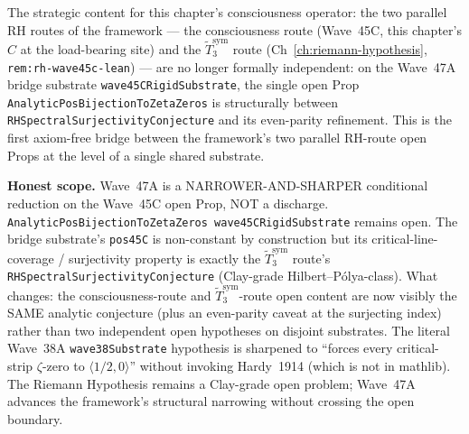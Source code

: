 \begin{remark}
\begin{itemize}
\end{itemize}
The strategic content for this chapter's consciousness operator: the two parallel RH routes of the framework --- the consciousness route (Wave~45C, this chapter's $C$ at the load-bearing site) and the $\widetilde{T}_3^{\mathrm{sym}}$ route (Ch~\ref{ch:riemann-hypothesis}, \texttt{rem:rh-wave45c-lean}) --- are no longer formally independent: on the Wave~47A bridge substrate \texttt{wave45CRigidSubstrate}, the single open Prop \texttt{AnalyticPosBijectionToZetaZeros} is structurally between \texttt{RHSpectralSurjectivityConjecture} and its even-parity refinement. This is the first axiom-free bridge between the framework's two parallel RH-route open Props at the level of a single shared substrate.

\textbf{Honest scope.} Wave~47A is a NARROWER-AND-SHARPER conditional reduction on the Wave~45C open Prop, NOT a discharge. \texttt{AnalyticPosBijectionToZetaZeros wave45CRigidSubstrate} remains open. The bridge substrate's \texttt{pos45C} is non-constant by construction but its critical-line-coverage / surjectivity property is exactly the $\widetilde{T}_3^{\mathrm{sym}}$ route's \texttt{RHSpectralSurjectivityConjecture} (Clay-grade Hilbert--P\'olya-class). What changes: the consciousness-route and $\widetilde{T}_3^{\mathrm{sym}}$-route open content are now visibly the SAME analytic conjecture (plus an even-parity caveat at the surjecting index) rather than two independent open hypotheses on disjoint substrates. The literal Wave~38A \texttt{wave38Substrate} hypothesis is sharpened to ``forces every critical-strip $\zeta$-zero to $\langle 1/2, 0\rangle$'' without invoking Hardy~1914 (which is not in mathlib). The Riemann Hypothesis remains a Clay-grade open problem; Wave~47A advances the framework's structural narrowing without crossing the open boundary.
\end{remark}

